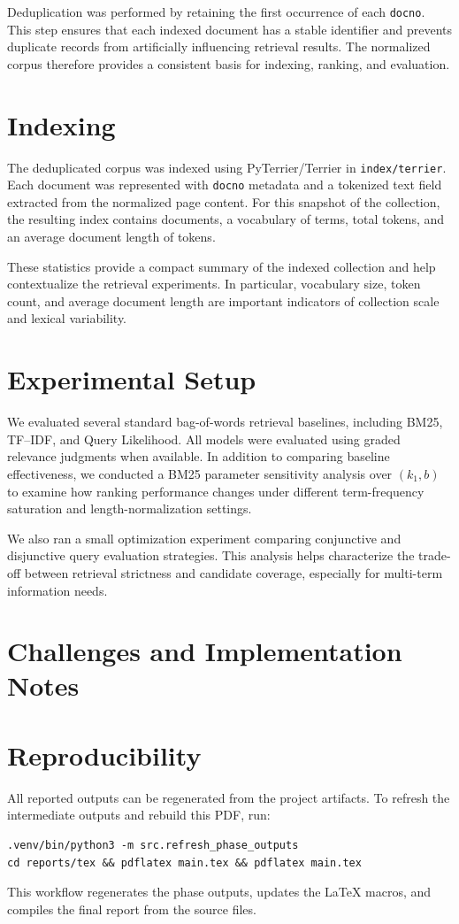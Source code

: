 \documentclass[11pt,a4paper]{article}
\begin{document}
Deduplication was performed by retaining the first occurrence of each \texttt{docno}. This step ensures that each indexed document has a stable identifier and prevents duplicate records from artificially influencing retrieval results. The normalized corpus therefore provides a consistent basis for indexing, ranking, and evaluation.

\section{Indexing}
The deduplicated corpus was indexed using PyTerrier/Terrier in \texttt{index/terrier}. Each document was represented with \texttt{docno} metadata and a tokenized text field extracted from the normalized page content. For this snapshot of the collection, the resulting index contains \textbf{\SummaryDocs} documents, a vocabulary of \textbf{\SummaryVocab} terms, \textbf{\SummaryTokens} total tokens, and an average document length of \textbf{\SummaryAvgLen} tokens.

These statistics provide a compact summary of the indexed collection and help contextualize the retrieval experiments. In particular, vocabulary size, token count, and average document length are important indicators of collection scale and lexical variability.

\section{Experimental Setup}
We evaluated several standard bag-of-words retrieval baselines, including BM25, TF--IDF, and Query Likelihood. All models were evaluated using graded relevance judgments when available. In addition to comparing baseline effectiveness, we conducted a BM25 parameter sensitivity analysis over $(k_1, b)$ to examine how ranking performance changes under different term-frequency saturation and length-normalization settings.

We also ran a small optimization experiment comparing conjunctive and disjunctive query evaluation strategies. This analysis helps characterize the trade-off between retrieval strictness and candidate coverage, especially for multi-term information needs.

\section{Challenges and Implementation Notes}




\section{Reproducibility}
All reported outputs can be regenerated from the project artifacts. To refresh the intermediate outputs and rebuild this PDF, run:
\begin{verbatim}
.venv/bin/python3 -m src.refresh_phase_outputs
cd reports/tex && pdflatex main.tex && pdflatex main.tex
\end{verbatim}

This workflow regenerates the phase outputs, updates the LaTeX macros, and compiles the final report from the source files.
\end{document}
